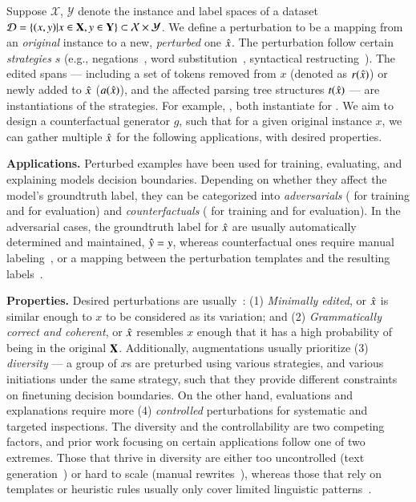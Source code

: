Suppose $\mathcal{X}$, $\mathcal{Y}$ denote the instance and label spaces of a dataset $\mathcal{D} = \{ (x,y) | x \in \mathbf{X}, y \in \mathbf{Y} \}\subset \mathcal{X} \times \mathcal{Y}$. We define a perturbation to be a mapping from an \emph{original} instance to a new, \emph{perturbed} one $\hat{x}$.
The perturbation follow certain \emph{strategies} $s$ (e.g., negations~\cite{kaushik2019learning}, word substitution~\cite{li-etal-2020-bert-attack}, syntactical restructing~\cite{iyyer2018adversarial}).
The edited spans --- including a set of tokens removed from $x$ (denoted as $r(\hat{x})$) or newly added to $\hat{x}$ ($a(\hat{x})$), and the affected parsing tree structures $t(\hat{x})$ --- are instantiations of the strategies.
For example, ,  both instantiate for .
We aim to design a counterfactual generator $g$, such that for a given original instance $x$, we can gather multiple $\hat{x}$ for the following applications, with desired properties.

\textbf{Applications.}
Perturbed examples have been used for training, evaluating, and explaining models decision boundaries.
Depending on whether they affect the model's groundtruth label, they can be categorized into \emph{adversarials} (\eg \citet{wu2019conditional} for training and \citet{jin2020bert} for evaluation) and \emph{counterfactuals} (\eg \citet{kaushik2019learning} for training and \citet{gardner2020contrast} for evaluation).
In the adversarial cases, the groundtruth label for $\hat{x}$ are usually automatically determined and maintained, \ie $\hat{y} = y$, whereas counterfactual ones require manual labeling~\cite{Khashabi2020MoreBF}, or a mapping between the perturbation templates and the resulting labels~\cite{li2020linguistically}.

\textbf{Properties.}
Desired perturbations are usually~\cite{morris2020textattack}:
(1) \emph{Minimally edited}, or $\hat{x}$ is similar enough to $x$ to be considered as its variation; and 
(2) \emph{Grammatically correct and coherent}, or $\hat{x}$ resembles $x$ enough that it has a high probability of being in the original $\mathbf{X}$.
Additionally, augmentations usually prioritize (3) \emph{diversity} --- a group of $x$s are preturbed using various strategies, and various initiations under the same strategy, such that they provide different constraints on finetuning decision boundaries.
On the other hand, evaluations and explanations require more (4) \emph{controlled} perturbations for systematic and targeted inspections.
The diversity and the controllability are two competing factors, and prior work focusing on certain applications follow one of two extremes.
Those that thrive in diversity are either too uncontrolled (\eg text generation~\cite{iyyer2018adversarial}) or hard to scale (\eg manual rewrites~\cite{kaushik2019learning, gardner2020contrast}), whereas those that rely on templates or heuristic rules usually only cover limited linguistic patterns~\cite{li2020linguistically}.



